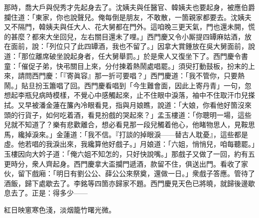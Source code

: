 那時，喬大戶與倪秀才先起身去了。沈姨夫與任醫官、韓姨夫也要起身，被應伯爵攔住道：「東家，你也說聲兒。俺每倒是朋友，不敢散，一箇親家都要去。沈姨夫又不隔門，韓姨夫與任大人、花大舅都在門外。這咱晚三更天氣，門也還未開，慌的甚麼？{}都來大坐回兒，左右關目還未了哩。」西門慶又令小厮提四罈麻姑酒，放在面前，說：「列位只了此四罈酒，我也不留了。」因拿大賞鍾放在吳大舅面前，說道：「那位離席破坐說起身者，任大舅舉罰。」於是衆人又復坐下了。西門慶令書童：「催促子弟，快弔關目上來，分付揀着熱鬧處唱罷。」須臾打動鼓板，扮末的上來，請問西門慶：「『寄眞容』那一折可要唱？」西門慶道：「我不管你，只要熱鬧。」貼旦扮玉簫唱了回。西門慶看唱到「今生難會面，因此上寄丹青」一句，忽想起李瓶兒病時模樣，不覺心中感觸起來，止不住眼中淚落，袖中不住取汗巾兒搽拭。{}又早被潘金蓮在簾內冷眼看見，{}指與月娘瞧，說道：「大娘，你看他好箇沒來頭的行貨子，如何吃着酒，看見扮戲的哭起來？」孟玉樓道：「你聰明一場，這些兒就不知道了？樂有悲歡離合，想必看見那一段兒觸着他心，他睹物思人，見鞍思馬，纔掉淚來。」金蓮道：「我不信。『打談的掉眼淚——替古人耽憂』，這些都是虛。他若唱的我淚出來，我纔算他好戲子。」{}月娘道：「六姐，悄悄兒，咱每聽罷。」玉樓因向大妗子道：「俺六姐不知怎的，只好快說嘴。」那戲子又做了一回，約有五更時分，衆人齊起身。西門慶拿大盃攔門遞酒，款留不住，俱送出門。看收了家伙，留下戲廂：「明日有劉公公、薛公公來祭奠，還做一日。」衆戲子答應。管待了酒飯，歸下處歇去了。李銘等四箇亦歸家不題。西門慶見天色已將曉，就歸後邊歇息去了。正是：得多少——

\begin{myquote} 
紅日映窻寒色淺，淡烟籠竹曙光微。
\end{myquote} 

